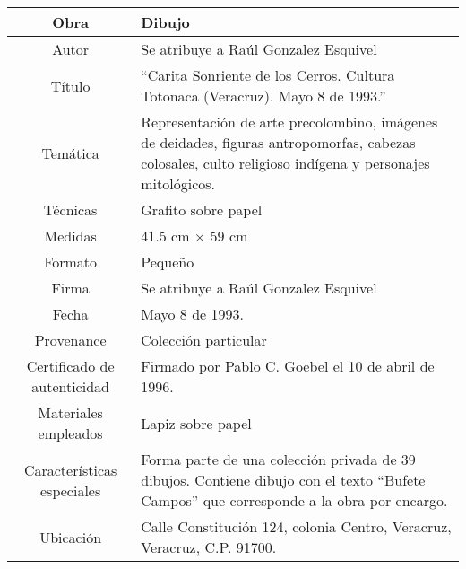 \documentclass[10pt,letter]{report}
\begin{document}
\begin{table}[H]
\centering
\begin{tabular}{|c|m{}|}
\hline
Obra& Dibujo	\\
\hline
Autor & Se atribuye a Ra\'ul Gonzalez Esquivel\\
\hline
T\'itulo & ``Carita Sonriente de los Cerros. Cultura Totonaca (Veracruz). Mayo 8 de 1993.''\\
\hline
Tem\'atica & Representaci\'on de arte precolombino, im\'agenes de deidades, figuras antropomorfas, cabezas colosales, culto religioso ind\'igena y personajes mitol\'ogicos.\\
\hline
T\'ecnicas &Grafito sobre papel \\
\hline
Medidas & 41.5 cm $\times$ 59 cm \\
\hline
 Formato & Peque\~no \\
 \hline
 Firma & Se atribuye a Ra\'ul Gonzalez Esquivel\\ 
 \hline
  Fecha & Mayo 8 de 1993.\\
 \hline
 Provenance & Colecci\'on particular\\
 \hline
 Certificado de autenticidad& Firmado por Pablo C. Goebel el 10 de abril de 1996.  \\
 \hline 
  Materiales empleados & Lapiz sobre papel\\
 \hline
 Caracter\'isticas especiales & Forma parte de una colecci\'on privada de 39 dibujos. 
Contiene dibujo con el texto ``Bufete Campos'' que corresponde a la obra por encargo. \\
\hline 
Ubicaci\'on & Calle Constituci\'on 124, colonia Centro, Veracruz, Veracruz, C.P. 91700.\\
\hline

\end{tabular}
\end{table}
\end{document}
